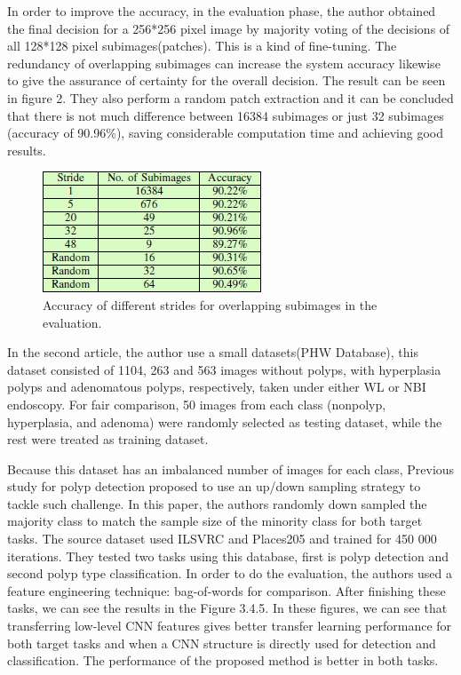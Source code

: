 \documentclass[10pt,twocolumn,letterpaper]{article}
\begin{document}
In order to improve the accuracy, in the evaluation phase, the author obtained the final decision for a 256*256 pixel image by majority voting of the decisions of all 128*128 pixel subimages(patches). This is a kind of fine-tuning. The redundancy of overlapping subimages can increase the system accuracy likewise to give the assurance of certainty for the overall decision. The result can be seen in figure 2. They also perform a random patch extraction and it can be concluded that there is not much difference between 16384 subimages or
just 32 subimages (accuracy of 90.96\%), saving considerable computation time and achieving good results.

\begin{figure}[t]
	\begin{center}
		\includegraphics[width=0.8\linewidth]{5}
	\end{center}
	\caption{Accuracy of different strides for overlapping subimages in the evaluation.} 
	\label{fig:long}
	\label{fig:onecol}
\end{figure}

In the second article\cite{zhang2017automatic}, the author use a small datasets(PHW Database), this dataset consisted of 1104, 263 and
563 images without polyps, with hyperplasia polyps and adenomatous polyps, respectively, taken under either WL or NBI endoscopy. For fair comparison, 50 images from each class (nonpolyp, hyperplasia, and adenoma) were randomly selected as testing dataset, while the rest were treated as training dataset.

Because this dataset has an imbalanced number of images for each class, Previous study for polyp detection proposed to use an up/down sampling strategy to tackle such challenge. In this paper, the authors randomly down sampled the majority class to match the sample size of the minority class for both target tasks. The source dataset used ILSVRC and Places205 and trained for 450 000 iterations. They tested two tasks using this database, first is polyp detection and second polyp type classification. In order to do the evaluation, the authors used a feature engineering technique: bag-of-words for comparison. After finishing these tasks, we can see the results in the Figure 3.4.5. In these figures, we can see that transferring low-level CNN features gives better transfer learning performance for both target tasks and when a CNN structure is directly
used for detection and classification. The performance of the proposed method is better in both tasks.
\end{document}
